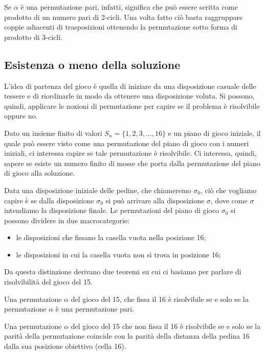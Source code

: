 Se $\alpha$ è una permutazione pari, infatti, significa che può essere scritta come prodotto di un numero pari di 2-cicli. Una volta fatto ciò basta raggruppare coppie adiacenti di trasposizioni ottenendo la permutazione sotto forma di prodotto di 3-cicli. 

\subsection{Esistenza o meno della soluzione ~\cite{8}}
L'idea di partenza del gioco è quella di iniziare da una disposizione casuale delle tessere e di riordinarle in modo da ottenere una disposizione voluta. 
Si possono, quindi, applicare le nozioni di permutazione per capire se il problema è risolvibile oppure no. 

Dato un insieme finito di valori $S_n=\{1,2,3,...,16\}$ e un piano di gioco iniziale, il quale può essere visto come una permutazione del piano di gioco con i numeri iniziali, ci interessa capire se tale permutazione è risolvibile. Ci interessa, quindi, sapere se esiste un numero finito di mosse che porta dalla permutazione del piano di gioco alla soluzione.

Data una disposizione iniziale delle pedine, che chiameremo $\sigma_0$, ciò che vogliamo capire è se dalla disposizione $\sigma_0$ si può arrivare alla disposizione $\sigma$, dove come $\sigma$ intendiamo la disposizione finale. 
Le permutazioni del piano di gioco $\sigma_0$ si possono dividere in due macrocategorie:
\begin{itemize}
    \item le disposizioni che fissano la casella vuota nella posizione 16;
    \item le disposizioni in cui la casella vuota non si trova in posizione 16;
\end{itemize}

Da questa distinzione derivano due teoremi su cui ci basiamo per parlare di risolvibilità del gioco del 15.

\begin{theorem}
    Una permutazione $\alpha$ del gioco del 15, che fissa il 16 è risolvibile se e solo se la permutazione $\alpha$ è una permutazione pari.
\end{theorem}

\begin{theorem}
    Una permutazione $\alpha$ del gioco del 15 che non fissa il 16 è risolvibile se e solo se la parità della permutazione coincide con la parità della distanza della pedina 16 dalla sua posizione obiettivo (cella 16).
\end{theorem}

